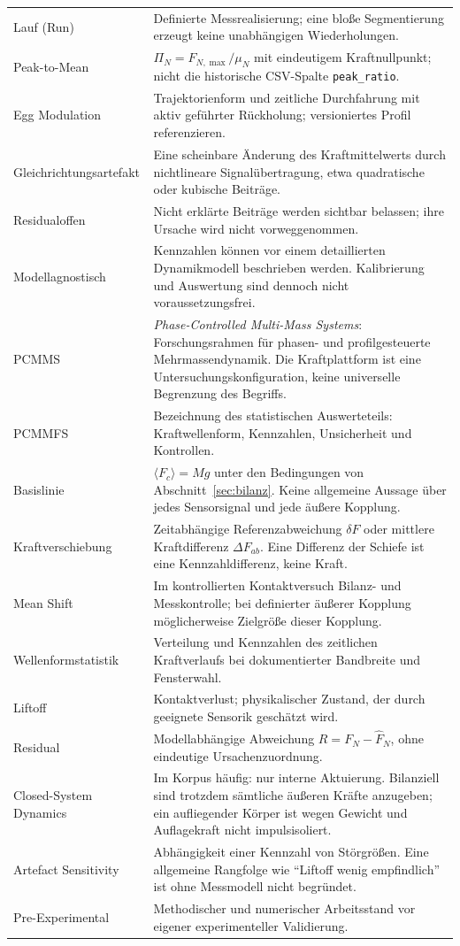 \documentclass[11pt,a4paper]{article}
\newcommand{\PCMMS}{\textit{Phase-Controlled Multi-Mass Systems}}
\begin{document}
\begin{longtable}{@{}L{.29\textwidth}L{.68\textwidth}@{}}
Lauf (Run)&Definierte Messrealisierung; eine bloße Segmentierung erzeugt keine unabhängigen Wiederholungen.\\
Peak-to-Mean&$\Pi_N=F_{N,\max}/\mu_N$ mit eindeutigem Kraftnullpunkt; nicht die historische CSV-Spalte \texttt{peak\_ratio}.\\
Egg Modulation&Trajektorienform und zeitliche Durchfahrung mit aktiv geführter Rückholung; versioniertes Profil referenzieren.\\
Gleichrichtungsartefakt&Eine scheinbare Änderung des Kraftmittelwerts durch nichtlineare Signalübertragung, etwa quadratische oder kubische Beiträge.\\
Residualoffen&Nicht erklärte Beiträge werden sichtbar belassen; ihre Ursache wird nicht vorweggenommen.\\
Modellagnostisch&Kennzahlen können vor einem detaillierten Dynamikmodell beschrieben werden. Kalibrierung und Auswertung sind dennoch nicht voraussetzungsfrei.\\
PCMMS&\PCMMS: Forschungsrahmen für phasen- und profilgesteuerte Mehrmassendynamik. Die Kraftplattform ist eine Untersuchungskonfiguration, keine universelle Begrenzung des Begriffs.\\
PCMMFS&Bezeichnung des statistischen Auswerteteils: Kraftwellenform, Kennzahlen, Unsicherheit und Kontrollen.\\
Basislinie&$\langle F_c\rangle=Mg$ unter den Bedingungen von Abschnitt~\ref{sec:bilanz}. Keine allgemeine Aussage über jedes Sensorsignal und jede äußere Kopplung.\\
Kraftverschiebung&Zeitabhängige Referenzabweichung $\delta F$ oder mittlere Kraftdifferenz $\Delta F_{ab}$. Eine Differenz der Schiefe ist eine Kennzahldifferenz, keine Kraft.\\
Mean Shift&Im kontrollierten Kontaktversuch Bilanz- und Messkontrolle; bei definierter äußerer Kopplung möglicherweise Zielgröße dieser Kopplung.\\
Wellenformstatistik&Verteilung und Kennzahlen des zeitlichen Kraftverlaufs bei dokumentierter Bandbreite und Fensterwahl.\\
Liftoff&Kontaktverlust; physikalischer Zustand, der durch geeignete Sensorik geschätzt wird.\\
Residual&Modellabhängige Abweichung $R=F_N-\hat F_N$, ohne eindeutige Ursachenzuordnung.\\
Closed-System Dynamics&Im Korpus häufig: nur interne Aktuierung. Bilanziell sind trotzdem sämtliche äußeren Kräfte anzugeben; ein aufliegender Körper ist wegen Gewicht und Auflagekraft nicht impulsisoliert.\\
Artefact Sensitivity&Abhängigkeit einer Kennzahl von Störgrößen. Eine allgemeine Rangfolge wie ``Liftoff wenig empfindlich'' ist ohne Messmodell nicht begründet.\\
Pre-Experimental&Methodischer und numerischer Arbeitsstand vor eigener experimenteller Validierung.\\
\bottomrule\end{longtable}
\end{document}

